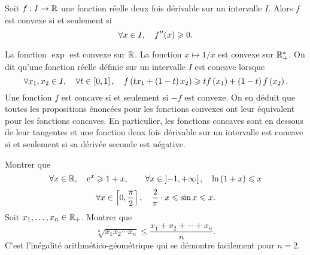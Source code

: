 \documentclass{magnoliaold}
\begin{document}
\begin{proposition}[utile=-3]
Soit $f:I\to\mathbb{R}$ une fonction réelle deux fois dérivable sur un intervalle $I$. Alors
$f$ est convexe si et seulement si
\[\forall x\in I ,\quad f''(x)\geqslant 0.\]
\end{proposition}

\begin{remarques}
\remarque La fonction $\exp$ est convexe sur $\mathbb{R}$. La fonction $x\mapsto 1/x$
  est convexe sur $\mathbb{R}_+^*$.
\remarque On dit qu'une fonction réelle définie sur un intervalle $I$ est
  concave lorsque
  \[\forall x_1,x_2\in I ,\quad \forall t\in\left[0,1\right] ,\quad
    f\left(tx_1+\left(1-t\right)x_2\right)\geqslant tf\left(x_1\right)+\left(1-t\right)f\left(x_2\right).\]
  Une fonction $f$ est concave si et seulement si $-f$ est convexe. On en déduit
  que toutes les propositions énoncées pour les fonctions convexes ont leur
  équivalent pour les fonctions concaves. En particulier, les fonctions
  concaves sont en dessous de leur tangentes et une fonction deux fois
  dérivable sur un intervalle est concave si et seulement si sa dérivée
  seconde est négative.
\end{remarques}

\begin{exos}
\exo Montrer que
  \[\forall x\in\mathbb{R} ,\quad {\rm e}^x \geqslant 1+x, \qquad \forall x\in\left]-1,+\infty\right[
    ,\quad \ln\left(1+x\right)\leqslant x\]
  \[\forall x\in\left[0,\frac{\pi}{2}\right] ,\quad
    \frac{2}{\pi}\cdot x\leqslant\sin x\leqslant x.\]
\exo Soit $x_1,\ldots,x_n\in\mathbb{R}_+$. Montrer que
  \[\sqrt[n]{x_1 x_2\cdots x_n}\leq\frac{x_1+x_2+\cdots+x_n}{n}.\]
  C'est l'inégalité arithmético-géométrique qui se démontre facilement pour
  $n=2$.
\end{exos}
\end{document}

